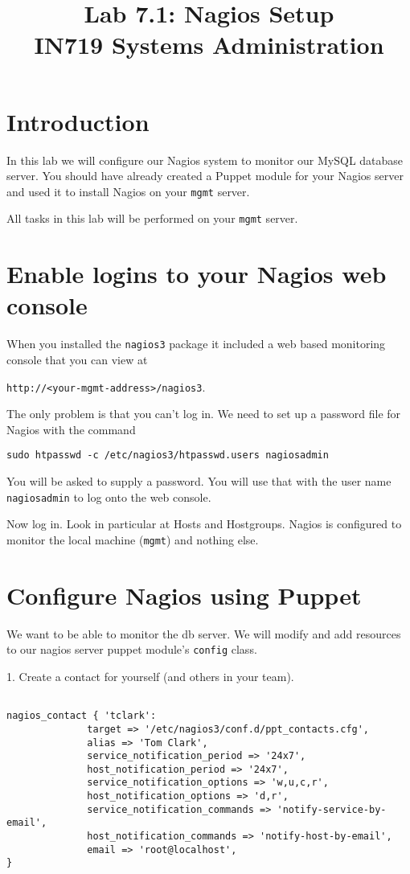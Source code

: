 \documentclass{article}         %
\title{Lab 7.1:  Nagios Setup\\ IN719 Systems Administration}
\date{}                                                 %
\begin{document}
\maketitle

\section*{Introduction}
In this lab we will configure our Nagios system to monitor our MySQL
database server.  You should have already created a Puppet module
for your Nagios server and used it to install Nagios on your 
\texttt{mgmt} server.

All tasks in this lab will be performed on your \texttt{mgmt} server.

\section{Enable logins to your Nagios web console}
When you installed the \texttt{nagios3} package it included a web based 
monitoring console that you can view at

\texttt{http://<your-mgmt-address>/nagios3}.

The only problem is that you can't log in.  We need to set up a password file
for Nagios with the command

 \texttt{sudo htpasswd -c /etc/nagios3/htpasswd.users nagiosadmin}

You will be asked to supply a password.  You will use that with the 
user name \texttt{nagiosadmin} to log onto the web console.

Now log in.  Look in particular at Hosts and Hostgroups.  Nagios is configured
to monitor the local machine (\texttt{mgmt}) and nothing else.

\section{Configure Nagios using Puppet}

We want to be able to monitor the db server.  We will modify and add resources to
our nagios server puppet module's \texttt{config} class. 

1.  Create a contact for yourself (and others in your team).

\begin{verbatim}

nagios_contact { 'tclark':
              target => '/etc/nagios3/conf.d/ppt_contacts.cfg',
              alias => 'Tom Clark',
              service_notification_period => '24x7',
              host_notification_period => '24x7',
              service_notification_options => 'w,u,c,r',
              host_notification_options => 'd,r',
              service_notification_commands => 'notify-service-by-email',
              host_notification_commands => 'notify-host-by-email',
              email => 'root@localhost',
}

  \end{verbatim}
\end{document}
